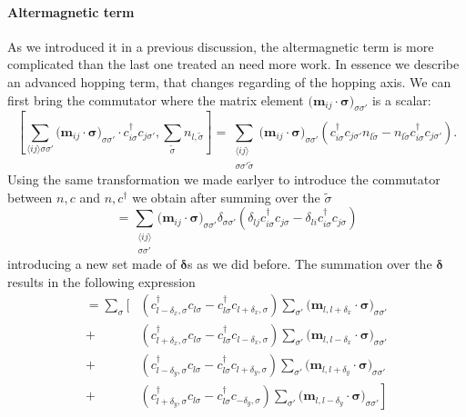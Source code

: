 \documentclass[../main.tex]{subfile}
\begin{document}
\paragraph{Altermagnetic term}
As we introduced it in a previous discussion, the altermagnetic term is more complicated than the last one treated an need more work. In essence we describe an 
advanced hopping term, that changes regarding of the hopping axis.
We can first bring the commutator where the matrix element $\bigl(\bm{m}_{ij}\cdot\bm{\sigma}\bigr)_{\sigma\sigma'} $ is a scalar:
\begin{equation*}
    \left[\sum_{\langle i j \rangle\sigma\sigma'}\bigl(\bm{m}_{ij}\cdot\bm{\sigma}\bigr)_{\sigma\sigma'} 
        \cdot c_{i\sigma}^{\dagger}c_{j\sigma'}, \sum_{\tilde{\sigma}} n_{l,\tilde{\sigma}}\right] 
    =\sum_{\substack{\langle i j \rangle \\\sigma\sigma'\tilde{\sigma}}} 
        \bigl(\bm{m}_{ij}\cdot\bm{\sigma}\bigr)_{\sigma\sigma'}  \left(c_{i\sigma}^{\dagger}c_{j\sigma'}n_{l\tilde{\sigma}} 
        -n_{l\tilde{\sigma}}c_{i\sigma}^{\dagger}c_{j\sigma'} \right).
\end{equation*}
Using the same transformation we made earlyer to introduce the commutator between $n,c$ and $n,c^{\dagger}$ we obtain after summing over the $\tilde{\sigma}$
\[
    = \sum_{\substack{\langle i j \rangle \\\sigma\sigma'}}  \bigl(\bm{m}_{ij}\cdot\bm{\sigma}\bigr)_{\sigma\sigma'}  
        \delta_{\sigma\sigma'} \left(\delta_{lj}c_{i\sigma}^{\dagger}c_{j\sigma} - \delta_{li}c_{i\sigma}^{\dagger}c_{j\sigma}\right)
\]
introducing a new set made of  $\bm{\delta}$s as we did before. The summation over the $\bm{\delta}$ results in the following  expression
\begin{equation}\label{eq:CurrentAltermagCommu}
    \begin{aligned}
        = \sum_{\sigma}\Biggl[&
                \left(c_{l-\delta_x,\sigma}^{\dagger}c_{l\sigma} - c_{l\sigma}^{\dagger}c_{l+\delta_x,\sigma} \right) 
                    \sum_{\sigma'}\bigl(\bm{m}_{l,l+\delta_x}\cdot\bm{\sigma}\bigr)_{\sigma\sigma'}\\
                +&\left(c_{l+\delta_x,\sigma}^{\dagger}c_{l\sigma} - c_{l\sigma}^{\dagger}c_{l-\delta_x,\sigma} \right) 
                    \sum_{\sigma'}\bigl(\bm{m}_{l,l-\delta_x}\cdot\bm{\sigma}\bigr)_{\sigma\sigma'}\\
                +&\left(c_{l-\delta_y,\sigma}^{\dagger}c_{l\sigma} - c_{l\sigma}^{\dagger}c_{l+\delta_y,\sigma} \right) 
                    \sum_{\sigma'}\bigl(\bm{m}_{l,l+\delta_y}\cdot\bm{\sigma}\bigr)_{\sigma\sigma'}\\
                +&\left.\left(c_{l+\delta_y,\sigma}^{\dagger}c_{l\sigma} - c_{l\sigma}^{\dagger}c_{-\delta_y,\sigma} \right) 
                    \sum_{\sigma'}\bigl(\bm{m}_{l,l-\delta_y}\cdot\bm{\sigma}\bigr)_{\sigma\sigma'}\right]
    \end{aligned}
\end{equation} 
\end{document}

